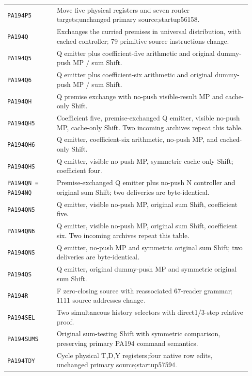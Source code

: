 \begin{longtable}{@{}p{.29\linewidth}p{.65\linewidth}@{}}
\texttt{PA194P5} & Move five physical registers and seven router targets;unchanged primary source;startup56158.\\[3pt]
\texttt{PA194Q} & Exchanges the curried premises in universal distribution, with cached controller; 79 primitive source instructions change.\\[3pt]
\texttt{PA194Q5} & Q emitter plus coefficient-five arithmetic and original dummy-push MP / sum Shift.\\[3pt]
\texttt{PA194Q6} & Q emitter plus coefficient-six arithmetic and original dummy-push MP / sum Shift.\\[3pt]
\texttt{PA194QH} & Q premise exchange with no-push visible-result MP and cache-only Shift.\\[3pt]
\texttt{PA194QH5} & Coefficient five, premise-exchanged Q emitter, visible no-push MP, cache-only Shift. Two incoming archives repeat this table.\\[3pt]
\texttt{PA194QH6} & Q emitter, coefficient-six arithmetic, no-push MP, and cached-only Shift.\\[3pt]
\texttt{PA194QHS} & Q emitter, visible no-push MP, symmetric cache-only Shift; coefficient four.\\[3pt]
\texttt{PA194QN = PA194NQ} & Premise-exchanged Q emitter plus no-push N controller and original sum Shift; two deliveries are byte-identical.\\[3pt]
\texttt{PA194QN5} & Q emitter, visible no-push MP, original sum Shift, coefficient five.\\[3pt]
\texttt{PA194QN6} & Q emitter, visible no-push MP, original sum Shift, coefficient six. Two incoming archives repeat this table.\\[3pt]
\texttt{PA194QNS} & Q emitter, no-push MP and symmetric original sum Shift; two deliveries are byte-identical.\\[3pt]
\texttt{PA194QS} & Q emitter, original dummy-push MP and symmetric original sum Shift.\\[3pt]
\texttt{PA194R} & F zero-closing source with reassociated 67-reader grammar; 1111 source addresses change.\\[3pt]
\texttt{PA194SEL} & Two simultaneous history selectors with direct1/3-step relative proof.\\[3pt]
\texttt{PA194SUMS} & Original sum-testing Shift with symmetric comparison, preserving primary PA194 command semantics.\\[3pt]
\texttt{PA194TDY} & Cycle physical T,D,Y registers;four native row edits, unchanged primary source;startup57594.\\[3pt]

\end{longtable}
